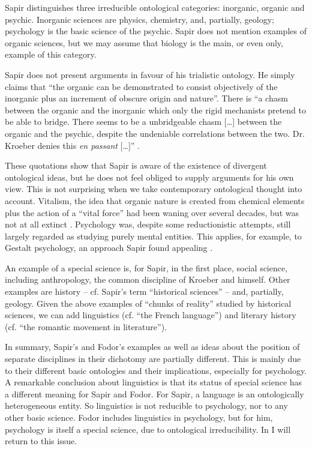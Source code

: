 \documentclass[output=paper]{langscibook}
\begin{document}
Sapir distinguishes three irreducible ontological categories: inorganic, organic and psychic. Inorganic sciences are physics, chemistry, and, partially, geology; psychology is the basic science of the psychic. Sapir does not mention examples of organic sciences, but we may assume that biology is the main, or even only, example of this category.

Sapir does not present arguments in favour of his trialistic ontology. He simply claims that ``the organic can be demonstrated to consist objectively of the inorganic plus an increment of obscure origin and nature''. There is ``a chasm between the organic and the inorganic which only the rigid mechanists pretend to be able to bridge. There seems to be a unbridgeable chasm […] between the organic and the psychic, despite the undeniable correlations between the two. Dr. Kroeber denies this \emph{en passant} […]'' \citep[444]{Sapir1917}.

These quotations show that Sapir is aware of the existence of divergent ontological ideas, but he does not feel obliged to supply arguments for his own view. This is not surprising when we take contemporary ontological thought into account. Vitalism, the idea that organic nature is created from chemical elements plus the action of a ``vital force'' had been waning over several decades, but was not at all extinct \citep[cf.][]{Beckner1967}. Psychology was, despite some reductionistic attempts, still largely regarded as studying purely mental entities. This applies, for example, to Gestalt psychology, an approach Sapir found appealing \citep[cf.][xvi]{Sapir2002}.

An example of a special science is, for Sapir, in the first place, social science, including anthropology, the common discipline of Kroeber and himself. Other examples are history -- cf. Sapir's term ``historical sciences'' -- and, partially, geology. Given the above examples of ``chunks of reality'' studied by historical sciences, we can add linguistics (cf. ``the French language'') and literary history (cf. ``the romantic movement in literature'').

In summary, Sapir's and Fodor's examples as well as ideas about the position of separate disciplines in their dichotomy are partially different. This is mainly due to their different basic ontologies and their implications, especially for psychology. A remarkable conclusion about linguistics is that its status of special science has a different meaning for Sapir and Fodor. For Sapir, a language is an ontologically heterogeneous entity. So linguistics is not reducible to psychology, nor to any other basic science. Fodor includes linguistics in psychology, but for him, psychology is itself a special science, due to ontological irreducibility. In  I will return to this issue.
\end{document}
